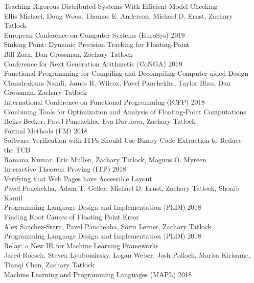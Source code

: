 \documentclass[10pt]{article}
\begin{document}
Teaching Rigorous Distributed Systems With Efficient Model Checking \\
Ellis Michael, Doug Woos, Thomas E. Anderson, Michael D. Ernst, Zachary Tatlock \\
European Conference on Computer Systems (EuroSys) 2019 \\

Sinking Point: Dynamic Precision Tracking for Floating-Point \\
Bill Zorn, Dan Grossman, Zachary Tatlock \\
Conference for Next Generation Arithmetic (CoNGA) 2019 \\

Functional Programming for Compiling and Decompiling Computer-aided Design \\
Chandrakana Nandi, James R. Wilcox, Pavel Panchekha, Taylor Blau, Dan Grossman, Zachary Tatlock \\
International Conference on Functional Programming (ICFP) 2018 \\

Combining Tools for Optimization and Analysis of Floating-Point Computations \\
Heiko Becker, Pavel Panchekha, Eva Darulova, Zachary Tatlock \\
Formal Methods (FM) 2018 \\

Software Verification with ITPs Should Use Binary Code Extraction to Reduce the TCB \\
Ramana Kumar, Eric Mullen, Zachary Tatlock, Magnus O. Myreen \\
Interactive Theorem Proving (ITP) 2018 \\

Verifying that Web Pages have Accessible Layout \\
Pavel Panchekha, Adam T. Geller, Michael D. Ernst, Zachary Tatlock, Shoaib Kamil \\
Programming Language Design and Implementation (PLDI) 2018 \\

Finding Root Causes of Floating Point Error \\
Alex Sanchez-Stern, Pavel Panchekha, Sorin Lerner, Zachary Tatlock \\
Programming Language Design and Implementation (PLDI) 2018 \\

Relay: a New IR for Machine Learning Frameworks \\
Jared Roesch, Steven Lyubomirsky, Logan Weber, Josh Pollock, Marisa Kirisame, Tianqi Chen, Zachary Tatlock \\
Machine Learning and Programming Languages (MAPL) 2018 \\
\end{document}
